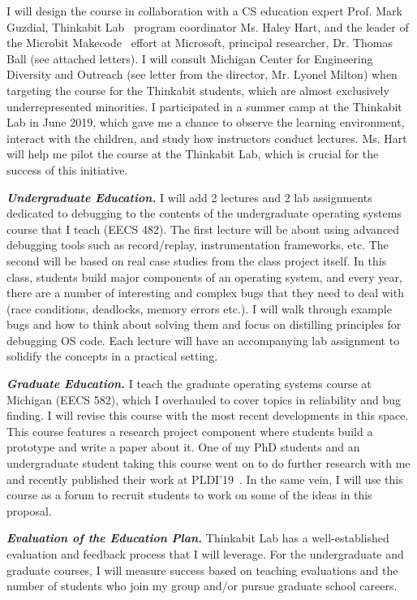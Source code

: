I will design the course in collaboration with a CS education expert Prof. Mark Guzdial, Thinkabit Lab~\cite{Qualcomm7:online} program coordinator Ms. Haley Hart, and the leader of the Microbit Makecode~\cite{Microsof90:online} effort at Microsoft, principal researcher, Dr. Thomas Ball (see attached letters). I will consult Michigan Center for Engineering Diversity and Outreach (see letter from the director, Mr. Lyonel Milton) when targeting the course for the Thinkabit students, which are almost exclusively underrepresented minorities. I participated in a summer camp at the Thinkabit Lab in June 2019, which gave me a chance to observe the learning environment, interact with the children, and study how instructors conduct lectures. Ms. Hart will help me pilot the course at the Thinkabit Lab, which is crucial for the success of this initiative.

\noindent \textit{\textbf{Undergraduate Education.}} I will add 2 lectures and 2 lab assignments dedicated to debugging to the contents of the undergraduate operating systems course that I teach (EECS 482). The first lecture will be about using advanced debugging tools such as record/replay, instrumentation frameworks, etc. The second will be based on real case studies from the class project itself. In this class, students build major components of an operating system, and every year, there are a number of interesting and complex bugs that they need to deal with (race conditions, deadlocks, memory errors etc.). I will walk through example bugs and how to think about solving them and focus on distilling principles for debugging OS code. Each lecture will have an accompanying lab assignment to solidify the concepts in a practical setting.

\noindent \textit{\textbf{Graduate Education.}} I teach the graduate operating systems course at Michigan (EECS 582), which I overhauled to cover topics in reliability and bug finding. I will revise this course with the most recent developments in this space. This course features a research project component where students build a prototype and write a paper about it. One of my PhD students and an undergraduate student taking this course went on to do further research with me and recently published their work at PLDI'19~\cite{huron}. In the same vein, I will use this course as a forum to recruit students to work on some of the ideas in this proposal.

\noindent \textit{\textbf{Evaluation of the Education Plan.}} Thinkabit Lab has a well-established evaluation and feedback process that I will leverage. For the undergraduate and graduate courses, I will measure success based on teaching evaluations and the number of students who join my group and/or pursue graduate school careers.


